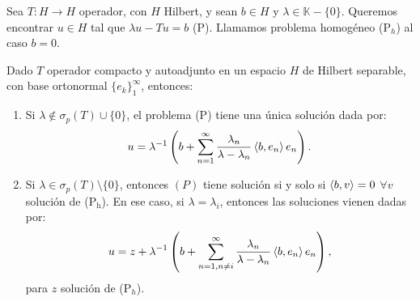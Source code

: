 \begin{definition}
  Sea $T:H\to H$ operador, con $H$ Hilbert, y sean $b\in H$ y $\lambda\in
  \mathbb{K}-\{0\} $. Queremos encontrar $u\in H$ tal que $\lambda u-Tu=b$ (P).
  Llamamos problema homogéneo (P$_h$) al caso $b=0$.
\end{definition}

\begin{theorem}
  \label{th:fredholm}
  Dado $T$ operador compacto y autoadjunto en un espacio $H$ de Hilbert
  separable, con base ortonormal $\{e_k\}_1^\infty$, entonces:
  \begin{enumerate}
    \item Si $\lambda\not\in \sigma_p(T) \cup \{0\} $, el problema (P) tiene una
      única solución dada por:
       \[
      u=\lambda^{-1}\left( b+ \sum_{n=1}^{\infty}
      \frac{\lambda_n}{\lambda-\lambda_n}\left\langle b,e_n\right\rangle e_n \right) 
      .\] 
    \item Si $\lambda \in \sigma_p(T)\setminus \{0\}$, entonces $(P)$ tiene
      solución si y solo si  $\left\langle b,v\right\rangle=0$ $\forall v$ solución de
      (P$_{\text{h}}$). En ese caso, si $\lambda=\lambda_i$, entonces las
      soluciones vienen dadas por:
       \[
      u=z+\lambda^{-1}\left(b+ \sum_{n=1,n\neq i}^{\infty}
      \frac{\lambda_n}{\lambda-\lambda_n}\left\langle b,e_n\right\rangle e_n \right) 
      ,\] 
      para $z$ solución de (P$_h$).
  \end{enumerate}
\end{theorem}

